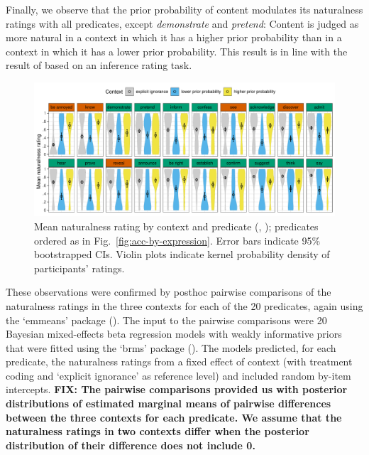 \documentclass[11pt,fleqn]{article}
\newcommand{\6}{\mbox{$[\hspace*{-.6mm}[$}}
\newcommand{\9}{\mbox{$]\hspace*{-.6mm}]$}}
\begin{document}
Finally, we observe that the prior probability of content modulates its naturalness ratings with all predicates, except {\em demonstrate} and {\em pretend}: Content is judged as more natural in a context in which it has a higher prior probability than in a context in which it has a lower prior probability. This result is in line with the result of \citealt{degen-tonhauser-openmind} based on an inference rating task.

\begin{figure}[h!]
\centering
\includegraphics[width=\textwidth]{../../results/main/13explicitIgnorance/graphs/naturalness-by-context-and-predicate}
\caption{\small{Mean naturalness rating by context and predicate (, ); predicates ordered as in Fig.~\ref{fig:acc-by-expression}. Error bars indicate 95\% bootstrapped CIs. Violin plots indicate kernel probability density of participants' ratings}.}\label{fig:acc-by-context}
\end{figure}

These observations were confirmed by posthoc pairwise comparisons of the naturalness ratings in the three contexts for each of the 20 predicates, again using the `emmeans' package (\citealt{emmeans}). The input to the pairwise comparisons were 20 Bayesian mixed-effects beta regression models with weakly informative priors that were fitted using the `brms' package (\citealt{buerkner2017}). The models predicted, for each predicate, the naturalness ratings from a fixed effect of context (with treatment coding and `explicit ignorance' as reference level) and included random by-item intercepts. {\bf FIX: The pairwise comparisons provided us with posterior distributions of estimated marginal means of pairwise differences between the three contexts for each predicate. We assume that the naturalness ratings in two contexts differ when the posterior distribution of their difference does not include 0.}
\end{document}
